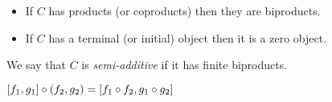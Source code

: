 \begin{proposition}
\item
\begin{itemize}
\item If $C$ has products (or coproducts) then they are biproducts.
\item If $C$ has a terminal (or initial) object then it is a zero object.
\end{itemize}
\end{proposition}

\noindent We say that $C$ is \emph{semi-additive} if it has finite biproducts.

\begin{proposition}
$[f_1, g_1] \circ (f_2,g_2) = [f_1 \circ f_2, g_1 \circ g_2]$
\end{proposition}
